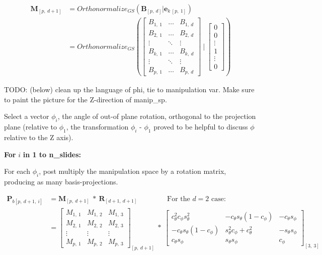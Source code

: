 \documentclass{monashthesis}
\begin{document}
\begin{align*}
  \textbf{M}_{[p,~d+1]}
  &= Orthonormalize_{GS}( \textbf{B}_{[p,~d]}|\textbf{e}_{k~[p,~1]} ) \\
  &= Orthonormalize_{GS}
  \left(
    \begin{bmatrix}
      B_{1,~1} & \dots  & B_{1,~d} \\
      B_{2,~1} & \dots  & B_{2,~d} \\
      \vdots   & \ddots & \vdots   \\
      B_{k,~1} & \dots  & B_{k,~d} \\
      \vdots   & \ddots & \vdots   \\
      B_{p,~1} & \dots  & B_{p,~d}
    \end{bmatrix}
  ~|~
    \begin{bmatrix}
      0 \\
      0 \\
      \vdots \\
      1 \\
      \vdots \\
      0
    \end{bmatrix}
  \right)
\end{align*}

TODO: (below) clean up the language of phi, tie to manipulation var.
Make sure to paint the picture for the Z-direction of manip\_sp.

Select a vector \(\phi_i\), the angle of out-of plane rotation,
orthogonal to the projection plane (relative to \(\phi_1\), the
transformation \(\phi_i\) - \(\phi_1\) proved to be helpful to discuss
\(\phi\) relative to the Z axis).

\textbf{For } \(i\) \textbf{in 1 to n\_slides:}

For each \(\phi_i\), post multiply the manipulation space by a rotation
matrix, producing as many basis-projections.

\begin{align*}
  \textbf{P}_{b[p,~d+1,~i]}
  &= \textbf{M}_{[p,~d+1]} ~*~ \textbf{R}_{[d+1,~d+1]} 
    ~~~~~~~~~~~~~~~~~~~\text{For the $d=2$ case:} \\
  &= \begin{bmatrix}
    M_{1,~1} & M_{1,~2} & M_{1,~3} \\
    M_{2,~1} & M_{2,~2} & M_{2,~3} \\
    \vdots   & \vdots   & \vdots   \\
    M_{p,~1} & M_{p,~2} & M_{p,~3}
  \end{bmatrix}_{[p,~d+1]}
    ~*~
  \begin{bmatrix}
    c_\theta^2 c_\phi s_\theta^2 &
    -c_\theta s_\theta (1 - c_\phi) &
    -c_\theta s_\phi \\
    -c_\theta s_\theta (1 - c_\phi) &
    s_\theta^2 c_\phi + c_\theta^2 &
    -s_\theta s_\phi \\
    c_\theta s_\phi &
    s_\theta s_\phi &
    c_\phi
  \end{bmatrix}_{[3,~3]}
\end{align*}
\end{document}
